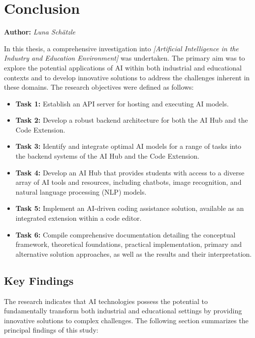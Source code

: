\chapter{Conclusion}
\label{chap:Conclusion}
\textbf{Author:} \textit{Luna Schätzle}



In this thesis, a comprehensive investigation into \emph{[Artificial Intelligence in the Industry and Education Environment]} was undertaken. The primary aim was to explore the potential applications of AI within both industrial and educational contexts and to develop innovative solutions to address the challenges inherent in these domains. The research objectives were defined as follows:

\begin{itemize}
    \item \textbf{Task 1:} Establish an API server for hosting and executing AI models.
    \item \textbf{Task 2:} Develop a robust backend architecture for both the AI Hub and the Code Extension.
    \item \textbf{Task 3:} Identify and integrate optimal AI models for a range of tasks into the backend systems of the AI Hub and the Code Extension.
    \item \textbf{Task 4:} Develop an AI Hub that provides students with access to a diverse array of AI tools and resources, including chatbots, image recognition, and natural language processing (NLP) models.
    \item \textbf{Task 5:} Implement an AI-driven coding assistance solution, available as an integrated extension within a code editor.
    \item \textbf{Task 6:} Compile comprehensive documentation detailing the conceptual framework, theoretical foundations, practical implementation, primary and alternative solution approaches, as well as the results and their interpretation.
\end{itemize}

\section{Key Findings}

The research indicates that AI technologies possess the potential to fundamentally transform both industrial and educational settings by providing innovative solutions 
to complex challenges. The following section summarizes the principal findings of this study:

